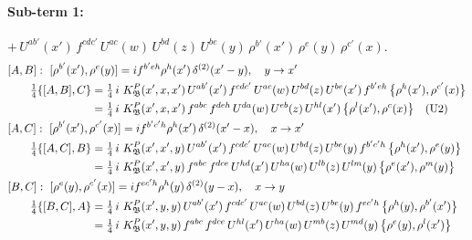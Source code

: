 \documentclass[10pt]{article}
\numberwithin{equation}{section}
\begin{document}
\paragraph{Sub-term 1:} $+\,U^{ab'}(x')\,f^{cdc'}\,U^{ac}(w)\,U^{bd}(z)\,U^{be}(y)\,\rho^{b'}(x')\,\rho^{e}(y)\,\rho^{c'}(x)$.
\begin{align}
&[A,B]:\ [\rho^{b'}(x'),\rho^{e}(y)]=i f^{b'eh}\rho^{h}(x')\,\delta^{(2)}(x'-y),\quad y\to x'\notag\\
&\qquad \tfrac14\{[A,B],C\}=\tfrac14\,i\,\,K^{P}_{\mathfrak B}(x',x,x')\,U^{ab'}(x')\,f^{cdc'}\,U^{ac}(w)\,U^{bd}(z)\,U^{be}(x')\,f^{b'eh}\,\big\{\rho^{h}(x'),\rho^{c'}(x)\big\}\notag\\
&\qquad\phantom{\tfrac14\{[A,B],C\}}=\tfrac14\,i\,\,K^{P}_{\mathfrak B}(x',x,x')\,f^{abc}\,f^{deh}\,U^{da}(w)\,U^{eb}(z)\,U^{hl}(x')\,\big\{\rho^{l}(x'),\rho^{c}(x)\big\}\quad\text{(U2)}
\label{B:eq:GI.IV.P-1-AB}\\
&[A,C]:\ [\rho^{b'}(x'),\rho^{c'}(x)]=i f^{b'c'h}\rho^{h}(x')\,\delta^{(2)}(x'-x),\quad x\to x'\notag\\
&\qquad \tfrac14\{[A,C],B\}=\tfrac14\,i\,\,K^{P}_{\mathfrak B}(x',x',y)\,U^{ab'}(x')\,f^{cdc'}\,U^{ac}(w)\,U^{bd}(z)\,U^{be}(y)\,f^{b'c'h}\,\big\{\rho^{h}(x'),\rho^{e}(y)\big\}\notag\\
&\qquad\phantom{\tfrac14\{[A,C],B\}}=\tfrac14\,i\,\,K^{P}_{\mathfrak B}(x',x',y)\,f^{abc}\,f^{dce}\,U^{hd}(x')\,U^{ha}(w)\,U^{lb}(z)\,U^{lm}(y)\,\big\{\rho^{e}(x'),\rho^{m}(y)\big\}
\label{B:eq:GI.IV.P-1-AC}\\
&[B,C]:\ [\rho^{e}(y),\rho^{c'}(x)]=i f^{ec'h}\rho^{h}(y)\,\delta^{(2)}(y-x),\quad x\to y\notag\\
&\qquad \tfrac14\{[B,C],A\}=\tfrac14\,i\,\,K^{P}_{\mathfrak B}(x',y,y)\,U^{ab'}(x')\,f^{cdc'}\,U^{ac}(w)\,U^{bd}(z)\,U^{be}(y)\,f^{ec'h}\,\big\{\rho^{h}(y),\rho^{b'}(x')\big\}\notag\\
&\qquad\phantom{\tfrac14\{[B,C],A\}}=\tfrac14\,i\,\,K^{P}_{\mathfrak B}(x',y,y)\,f^{abc}\,f^{dce}\,U^{hl}(x')\,U^{ha}(w)\,U^{mb}(z)\,U^{md}(y)\,\big\{\rho^{e}(y),\rho^{l}(x')\big\}
\label{B:eq:GI.IV.P-1-BC}
\end{align}
\end{document}
